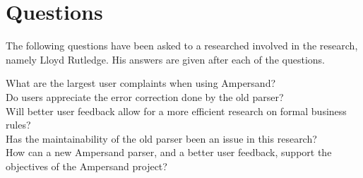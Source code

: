 
\section{Questions}
\label{sec:questions}
The following questions have been asked to a researched involved in the research, namely Lloyd Rutledge.
His answers are given after each of the questions.

\begin{description}
  \item [What are the largest user complaints when using Ampersand?]

  \item [Do users appreciate the error correction done by the old parser?]
  
  \item [Will better user feedback allow for a more efficient research on formal business rules?]
  
  \item [Has the maintainability of the old parser been an issue in this research?]
  
  \item [How can a new Ampersand parser, and a better user feedback, support the objectives of the Ampersand project?]

\end{description}
